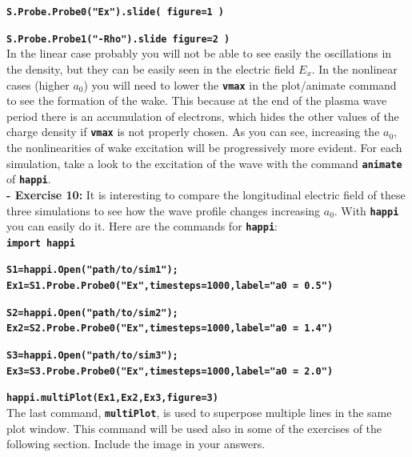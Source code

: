 \documentclass[a4paper,12pt]{extarticle}
\newcommand{\commandline}[1]{\texttt{\textbf{#1}}}
\begin{document}
\commandline{S.Probe.Probe0("Ex").slide( figure=1 )}

\commandline{S.Probe.Probe1("-Rho").slide figure=2 )}\\

In the linear case probably you will not be able to see easily the oscillations in the density, but they can be easily seen in the electric field $E_x$. In the nonlinear cases (higher $a_0$) you will need to lower the \commandline{vmax} in the plot/animate command to see the formation of  the wake. This because at the end of the plasma wave period there is an accumulation of electrons, which hides the other values of the charge density if \commandline{vmax}  is not properly chosen.
As you can see, increasing the $a_0$, the nonlinearities of wake excitation will be progressively more evident. For each simulation, take a look to the excitation of the wave with the command \commandline{animate} of \commandline{happi}.\\

\textbf{ - Exercise 10:} It is interesting to compare the longitudinal electric field of these three simulations to see how the wave profile changes increasing $a_0$. With \commandline{happi} you can easily do it. Here are the commands for \commandline{happi}:\\

\commandline{import happi}

\small{\commandline{S1=happi.Open("path/to/sim1"); Ex1=S1.Probe.Probe0("Ex",timesteps=1000,label="a0 = 0.5")}}

\commandline{S2=happi.Open("path/to/sim2"); Ex2=S2.Probe.Probe0("Ex",timesteps=1000,label="a0 = 1.4")}

\commandline{S3=happi.Open("path/to/sim3"); Ex3=S3.Probe.Probe0("Ex",timesteps=1000,label="a0 = 2.0")}

\commandline{happi.multiPlot(Ex1,Ex2,Ex3,figure=3)}\\

The last command, \commandline{multiPlot}, is used to superpose multiple lines in the same plot window.  This command will be used also in some of the exercises of the following section.  Include the image in your answers.
\end{document}
